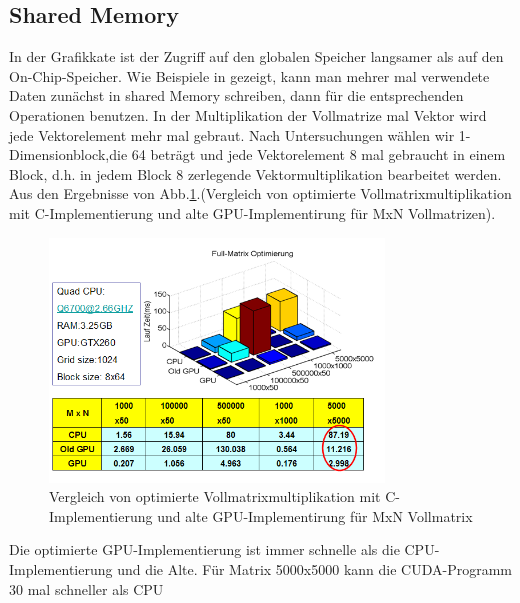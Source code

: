 \subsection{Shared Memory}
In der Grafikkate ist der Zugriff auf den globalen Speicher langsamer als auf den On-Chip-Speicher.  Wie Beispiele in \cite{cudapg} gezeigt, kann man mehrer mal verwendete Daten zunächst in shared Memory schreiben, dann für die entsprechenden Operationen benutzen. In der Multiplikation der Vollmatrize mal Vektor wird jede Vektorelement mehr mal gebraut. Nach Untersuchungen wählen wir 1-Dimensionblock,die 64 beträgt und jede Vektorelement 8 mal gebraucht in einem Block, d.h. in jedem Block 8 zerlegende Vektormultiplikation bearbeitet werden. Aus den Ergebnisse von Abb.\ref{sharememory}.(Vergleich von optimierte Vollmatrixmultiplikation mit C-Implementierung und alte GPU-Implementirung für MxN Vollmatrizen).
\begin{figure}[htbp]
\includegraphics[width=3.5in]{../xby/pic/sharememory}
\caption{Vergleich von optimierte Vollmatrixmultiplikation mit C-Implementierung und alte GPU-Implementirung für MxN Vollmatrix}
\label{sharememory}
\end{figure}

Die optimierte GPU-Implementierung ist immer schnelle als die CPU-Implementierung  und die Alte. Für Matrix 5000x5000 kann die CUDA-Programm 30 mal schneller als CPU

